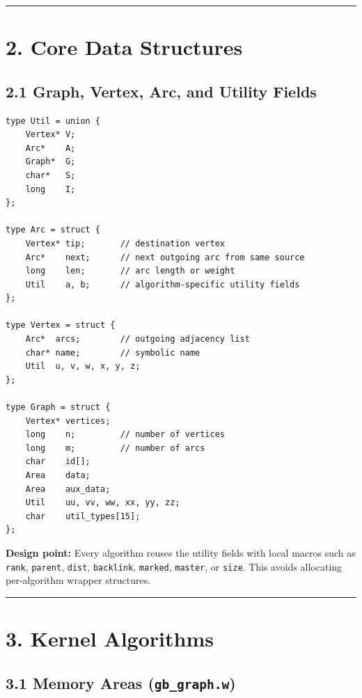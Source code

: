 \documentclass[11pt]{article}
\begin{document}
\begin{center}\rule{0.5\linewidth}{0.5pt}\end{center}

\section{2. Core Data Structures}\label{core-data-structures}

\subsection{2.1 Graph, Vertex, Arc, and Utility Fields}\label{graph-vertex-arc-and-utility-fields}

\begin{verbatim}
type Util = union {
    Vertex* V;
    Arc*    A;
    Graph*  G;
    char*   S;
    long    I;
};

type Arc = struct {
    Vertex* tip;       // destination vertex
    Arc*    next;      // next outgoing arc from same source
    long    len;       // arc length or weight
    Util    a, b;      // algorithm-specific utility fields
};

type Vertex = struct {
    Arc*  arcs;        // outgoing adjacency list
    char* name;        // symbolic name
    Util  u, v, w, x, y, z;
};

type Graph = struct {
    Vertex* vertices;
    long    n;         // number of vertices
    long    m;         // number of arcs
    char    id[];
    Area    data;
    Area    aux_data;
    Util    uu, vv, ww, xx, yy, zz;
    char    util_types[15];
};
\end{verbatim}

\textbf{Design point:} Every algorithm reuses the utility fields with local macros such as \texttt{rank}, \texttt{parent}, \texttt{dist}, \texttt{backlink}, \texttt{marked}, \texttt{master}, or \texttt{size}. This avoids allocating per-algorithm wrapper structures.

\begin{center}\rule{0.5\linewidth}{0.5pt}\end{center}

\section{3. Kernel Algorithms}\label{kernel-algorithms}

\subsection{\texorpdfstring{3.1 Memory Areas (\texttt{gb\_graph.w})}{3.1 Memory Areas (gb\_graph.w)}}\label{memory-areas-gb_graph.w}
\end{document}

